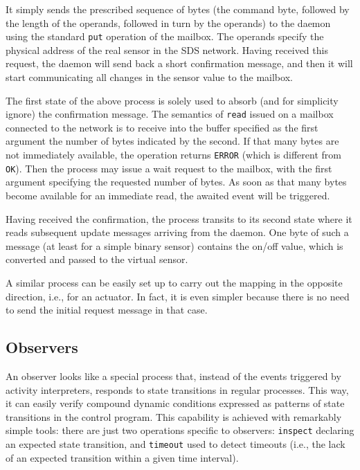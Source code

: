 It simply sends the prescribed sequence of bytes (the command byte, followed
by the length of the operands, followed in turn by the operands) to the
daemon using the standard {\tt put} operation of the mailbox.
The operands specify the physical address of the real sensor
in the SDS network.
Having received this request, the daemon will send back a short confirmation
message, and then it will start communicating all changes in the sensor
value to the mailbox.

The first state of the above process is solely used to absorb (and for
simplicity ignore) the confirmation message.
The semantics of {\tt read} issued on a mailbox connected to the network
is to receive into the buffer specified as the first argument
the number of bytes indicated by the second.
If that many bytes are not immediately available, the operation returns
{\tt ERROR} (which is different from {\tt OK}).
Then the process may issue a wait request to the mailbox, with the first
argument specifying the requested number of bytes.
As soon as that many bytes become available for an immediate read,
the awaited event will be triggered.

Having received the confirmation, the process transits to its second state
where it reads subsequent update messages arriving from the daemon.
One byte of such a message (at least for a simple binary sensor)
contains the on/off value, which is converted and passed to the
virtual sensor.

A similar process can be easily set up to carry out the mapping in the
opposite direction, i.e., for an actuator.
In fact, it is even simpler because there is no need to send the initial
request message in that case.

\subsection{Observers}

An observer looks like a special process that, instead of the events triggered
by activity interpreters, responds to state transitions in regular
processes.
This way, it can easily verify compound dynamic conditions expressed as
patterns of state transitions in the control program.
This capability is achieved with remarkably simple tools: there are just two
operations specific to observers: {\tt inspect} declaring an expected
state transition, and {\tt timeout} used to detect timeouts (i.e.,
the lack of an expected transition within a given time interval).


